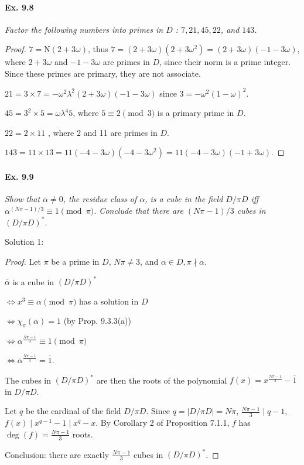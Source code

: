 \documentclass[11pt,a4paper]{article}
\newcommand{\n}{\mathrm{N}}
\begin{document}
\paragraph{Ex. 9.8}

{\it Factor the following numbers into primes in $D$ : $7,21,45,22$, and $143$.
}

\begin{proof}
$7=\n(2+3\omega)$, thus $ 7 = (2+3\omega)(2+3\omega^2) = (2+3\omega)(-1-3\omega)$, where $2 + 3\omega$ and $-1-3\omega$ are primes in $D$, since their norm is a prime integer. Since these primes are primary, they are not associate.

$21 = 3\times 7 = -\omega^2 \lambda^2 (2+3\omega)(-1-3\omega)$  since $3=-\omega^2(1-\omega)^2$.

$45 = 3^2\times 5 = \omega \lambda^4 5$, where $5 \equiv 2 \pmod 3$ is a primary prime in $D$.

$22=2\times 11$ , where 2 and 11 are primes in $D$.

$143 = 11\times 13 = 11(-4-3\omega)(-4-3\omega^2) = 11  (-4-3\omega)(-1+3\omega)$.
\end{proof}

\paragraph{Ex. 9.9}
{\it Show that $\overline{\alpha} \ne 0$, the residue class of $\alpha$, is a cube in the field $D/\pi D$ iff $\alpha^{(N\pi -1)/3} \equiv 1 \pmod \pi$. Conclude that there are $(N\pi - 1)/3$ cubes in $(D/\pi D)^*$.
}

\bigskip
Solution 1:
\begin{proof}
Let $\pi$ be a prime in $D$, $N\pi \ne 3$, and $\alpha \in D,\pi \nmid \alpha$.

$\overline{\alpha}$ is a cube in $(D/\pi D)^*$

$\iff x^3 \equiv \alpha \pmod \pi$ has a solution in $D$

$\iff \chi_{\pi}(\alpha)= 1$ \qquad \qquad (by Prop. 9.3.3(a))

$\iff \alpha^{\frac{N\pi-1}{3}} \equiv 1 \pmod \pi$

$\iff \overline{\alpha}^{\frac{N\pi-1}{3}}  = \overline{1}$.

The cubes in $(D/\pi D)^*$ are then the roots of the polynomial $f(x) = x^{\frac{N\pi-1}{3}} - \overline{1}$ in $D/\pi D$. 

Let $q$ be the cardinal of the field $D/\pi D$. Since $q = |D/\pi D| = N\pi$, $\frac{N\pi - 1}{3} \mid q-1$, $f(x) \mid x^{q-1}-1 \mid x^q-x$. By Corollary 2 of Proposition 7.1.1, $f$ has $\deg(f) = \frac{N\pi-1}{3}$ roots.

Conclusion: there are exactly $\frac{N\pi-1}{3}$ cubes in $(D/\pi D)^*$.
\end{proof}
\end{document}
